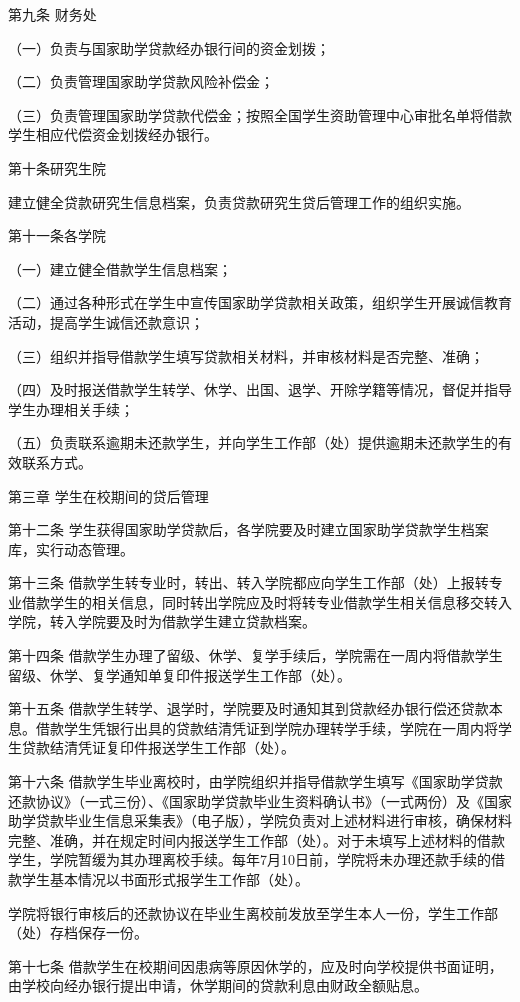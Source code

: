 \documentclass[UTF8,12pt,a4paper]{report}
\begin{document}
第九条 财务处

（一）负责与国家助学贷款经办银行间的资金划拨；

（二）负责管理国家助学贷款风险补偿金；

（三）负责管理国家助学贷款代偿金；按照全国学生资助管理中心审批名单将借款学生相应代偿资金划拨经办银行。

第十条研究生院

建立健全贷款研究生信息档案，负责贷款研究生贷后管理工作的组织实施。

第十一条各学院

（一）建立健全借款学生信息档案；

（二）通过各种形式在学生中宣传国家助学贷款相关政策，组织学生开展诚信教育活动，提高学生诚信还款意识；

（三）组织并指导借款学生填写贷款相关材料，并审核材料是否完整、准确；

（四）及时报送借款学生转学、休学、出国、退学、开除学籍等情况，督促并指导学生办理相关手续；

（五）负责联系逾期未还款学生，并向学生工作部（处）提供逾期未还款学生的有效联系方式。

第三章 学生在校期间的贷后管理

第十二条 学生获得国家助学贷款后，各学院要及时建立国家助学贷款学生档案库，实行动态管理。

第十三条 借款学生转专业时，转出、转入学院都应向学生工作部（处）上报转专业借款学生的相关信息，同时转出学院应及时将转专业借款学生相关信息移交转入学院，转入学院要及时为借款学生建立贷款档案。

第十四条 借款学生办理了留级、休学、复学手续后，学院需在一周内将借款学生留级、休学、复学通知单复印件报送学生工作部（处）。

第十五条 借款学生转学、退学时，学院要及时通知其到贷款经办银行偿还贷款本息。借款学生凭银行出具的贷款结清凭证到学院办理转学手续，学院在一周内将学生贷款结清凭证复印件报送学生工作部（处）。

第十六条 借款学生毕业离校时，由学院组织并指导借款学生填写《国家助学贷款还款协议》（一式三份）、《国家助学贷款毕业生资料确认书》（一式两份）及《国家助学贷款毕业生信息采集表》（电子版），学院负责对上述材料进行审核，确保材料完整、准确，并在规定时间内报送学生工作部（处）。对于未填写上述材料的借款学生，学院暂缓为其办理离校手续。每年7月10日前，学院将未办理还款手续的借款学生基本情况以书面形式报学生工作部（处）。

学院将银行审核后的还款协议在毕业生离校前发放至学生本人一份，学生工作部（处）存档保存一份。

第十七条 借款学生在校期间因患病等原因休学的，应及时向学校提供书面证明，由学校向经办银行提出申请，休学期间的贷款利息由财政全额贴息。
\end{document}
